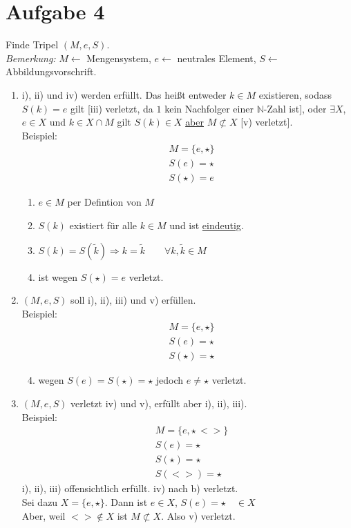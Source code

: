 \section{Aufgabe 4}
Finde Tripel $(M,e,S)$.\\\textit{Bemerkung:} $M \longleftarrow$ Mengensystem, $e \longleftarrow$ neutrales Element, $S \longleftarrow$ Abbildungsvorschrift.\\
\begin{enumerate}[label={\alph*)}]
  \item i), ii) und iv) werden erfüllt. Das heißt entweder $k\in M$ existieren, sodass $S(k)=e$ gilt [iii) verletzt, da $1$ kein Nachfolger einer $\mathbb{N}$-Zahl ist], oder $\exists X$, $e\in X$ und $k\in X\cap M$ gilt $S(k)\in X$ \underline{aber} $M\not\subset X$ [v) verletzt].\\
Beispiel:\begin{align*}&M=\{e,\star\}\\&S(e)=\star\\&S(\star)=e\end{align*}
  \begin{enumerate}[label={\roman*)}]
    \item $e\in M$ per Defintion von $M$
    \item $S(k)$ existiert für alle $k\in M$ und ist \underline{eindeutig}.
    \setcounter{enumii}{3}
    \item $S(k)=S(\tilde{k})\Longrightarrow k=\tilde{k} \qquad\forall k,\tilde{k} \in M$
    \setcounter{enumii}{2}
    \item ist wegen $S(\star)=e$ verletzt.
  \end{enumerate}
  \item $(M,e,S)$ soll i), ii), iii) und v) erfüllen.\\
  Beispiel:\begin{align*}&M=\{e,\star\}\\&S(e)=\star\\&S(\star)=\star\end{align*}
  \begin{enumerate}[label={\roman*)}]
    \setcounter{enumii}{3}
    \item wegen $S(e)=S(\star)=\star$ jedoch $e\neq\star$ verletzt.
  \end{enumerate}
  \item $(M,e,S)$ verletzt iv) und v), erfüllt aber i), ii), iii).\\
  Beispiel:\begin{align*}&M=\{e,\star\,<>\}\\&S(e)=\star\\&S(\star)=\star\\&S(<>)=\star\end{align*}
  i), ii), iii) offensichtlich erfüllt. iv) nach b) verletzt.\\
  Sei dazu $X=\{ e,\star \}$. Dann ist $e\in X$, $S(e)=\star \quad \in X$\\
  Aber, weil $<>\not\in X$ ist $M\not\subset X$. Also v) verletzt.
\end{enumerate}
